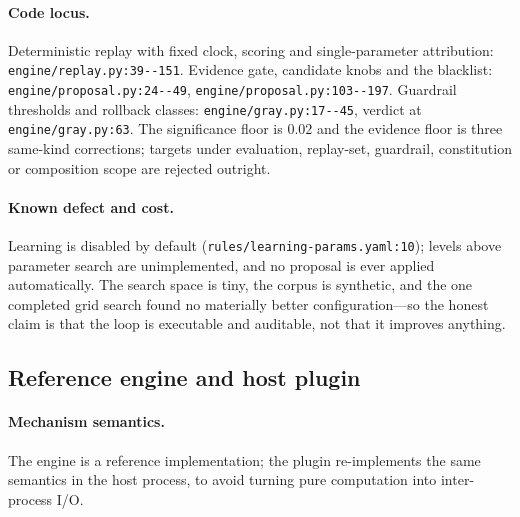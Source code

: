 \paragraph{Code locus.} Deterministic replay with fixed clock, scoring and
single-parameter attribution: \texttt{engine/\allowbreak{}replay.\allowbreak{}py:\allowbreak{}39-\allowbreak{}-\allowbreak{}151}. Evidence gate,
candidate knobs and the blacklist: \texttt{engine/\allowbreak{}proposal.\allowbreak{}py:\allowbreak{}24-\allowbreak{}-\allowbreak{}49},
\texttt{engine/\allowbreak{}proposal.\allowbreak{}py:\allowbreak{}103-\allowbreak{}-\allowbreak{}197}. Guardrail thresholds and rollback classes:
\texttt{engine/\allowbreak{}gray.\allowbreak{}py:\allowbreak{}17-\allowbreak{}-\allowbreak{}45}, verdict at \texttt{engine/gray.py:63}. The
significance floor is $0.02$ and the evidence floor is three same-kind
corrections; targets under evaluation, replay-set, guardrail, constitution or
composition scope are rejected outright.

\paragraph{Known defect and cost.} Learning is disabled by default
(\texttt{rules/\allowbreak{}learning-\allowbreak{}params.\allowbreak{}yaml:\allowbreak{}10}); levels above parameter search are
unimplemented, and no proposal is ever applied automatically. The search space
is tiny, the corpus is synthetic, and the one completed grid search found no
materially better configuration---so the honest claim is that the loop is
executable and auditable, not that it improves anything.

\subsection{Reference engine and host plugin}\label{sec:method:port}

\paragraph{Mechanism semantics.} The engine is a reference implementation; the
plugin re-implements the same semantics in the \host{} host process, to avoid
turning pure computation into inter-process I/O.

